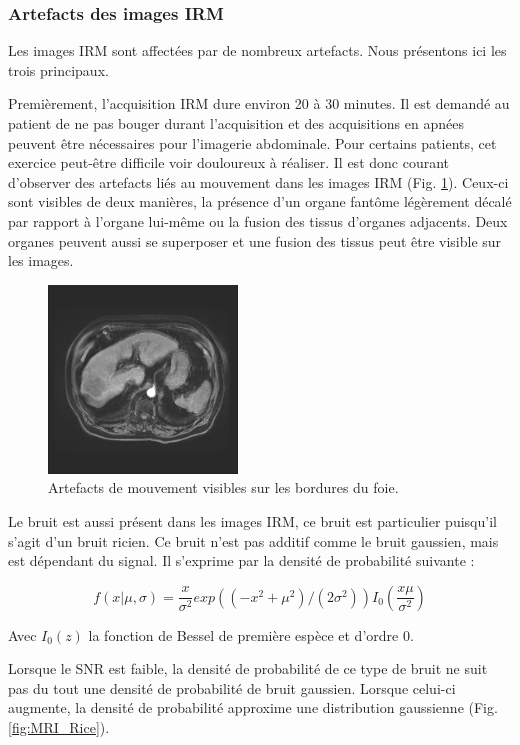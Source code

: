 \subsubsection{Artefacts des images IRM}

Les images IRM sont affectées par de nombreux artefacts. Nous présentons ici les trois principaux.

Premièrement, l'acquisition IRM dure environ 20 à 30 minutes. Il est demandé au patient de ne pas bouger durant l'acquisition et des acquisitions en apnées peuvent être nécessaires pour l'imagerie abdominale. Pour certains patients, cet exercice peut-être difficile voir douloureux à réaliser. Il est donc courant d'observer des artefacts liés au mouvement dans les images IRM (Fig. \ref{fig:MRI_movement}). Ceux-ci sont visibles de deux manières, la présence d'un organe fantôme légèrement décalé par rapport à l'organe lui-même ou la fusion des tissus d'organes adjacents. Deux organes peuvent aussi se superposer et une fusion des tissus peut être visible sur les images.

\begin{figure}
    \centering
    \includegraphics[height=5cm]{Images/MRI_movements.png}
    \caption{Artefacts de mouvement visibles sur les bordures du foie.}
    \label{fig:MRI_movement}
\end{figure}

Le bruit est aussi présent dans les images IRM, ce bruit est particulier puisqu'il s'agit d'un bruit ricien. Ce bruit n'est pas additif comme le bruit gaussien, mais est dépendant du signal. Il s'exprime par la densité de probabilité suivante : 

\begin{equation}
    f(x | \mu, \sigma) = \frac{x}{\sigma^2} exp ( (-x^2 + \mu^2)/(2\sigma^2) ) I_0 (\frac{x\mu}{\sigma^2})
    \end{equation}

Avec $I_0(z)$ la fonction de Bessel de première espèce et d'ordre 0. 

Lorsque le SNR est faible, la densité de probabilité de ce type de bruit ne suit pas du tout une densité de probabilité de bruit gaussien. Lorsque celui-ci augmente, la densité de probabilité approxime une distribution gaussienne (Fig. \ref{fig:MRI_Rice}).


